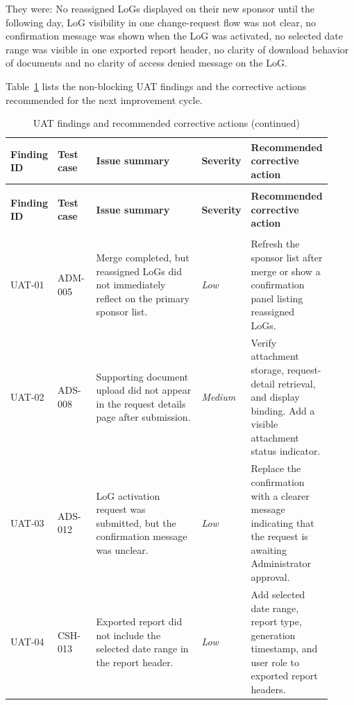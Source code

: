 They were: No reassigned LoGs displayed on their new sponsor until the following day, LoG visibility in one change-request flow was not clear, no confirmation message was shown when the LoG was activated, no selected date range was visible in one exported report header, no clarity of download behavior of documents and no clarity of access denied message on the LoG.

\setlength{\LTleft}{0pt}
\setlength{\LTright}{\fill}
Table~\ref{table:uat-findings} lists the non-blocking UAT findings and the corrective actions recommended for the next improvement cycle.

\begin{longtable}{>{\raggedright\arraybackslash}p{0.12\linewidth}
>{\raggedright\arraybackslash}p{0.12\linewidth}
>{\raggedright\arraybackslash}p{0.33\linewidth}
>{\raggedright\arraybackslash}p{0.10\linewidth}
>{\raggedright\arraybackslash}p{0.25\linewidth}}
\caption{UAT findings and recommended corrective actions}\label{table:uat-findings}\\
\toprule
\textbf{Finding ID} & \textbf{Test case} & \textbf{Issue summary} & \textbf{Severity} & \textbf{Recommended corrective action} \\
\midrule
\endfirsthead
\caption[]{UAT findings and recommended corrective actions (continued)}\\
\toprule
\textbf{Finding ID} & \textbf{Test case} & \textbf{Issue summary} & \textbf{Severity} & \textbf{Recommended corrective action} \\
\midrule
\endhead
\midrule
\multicolumn{5}{r}{\textit{Continued on next page}}\\
\endfoot
\bottomrule
\endlastfoot
UAT-01 & ADM-005 & Merge completed, but reassigned LoGs did not immediately reflect on the primary sponsor list. & \textit{Low} & Refresh the sponsor list after merge or show a confirmation panel listing reassigned LoGs. \\
UAT-02 & ADS-008 & Supporting document upload did not appear in the request details page after submission. & \textit{Medium} & Verify attachment storage, request-detail retrieval, and display binding. Add a visible attachment status indicator. \\
UAT-03 & ADS-012 & LoG activation request was submitted, but the confirmation message was unclear. & \textit{Low} & Replace the confirmation with a clearer message indicating that the request is awaiting Administrator approval. \\
UAT-04 & CSH-013 & Exported report did not include the selected date range in the report header. & \textit{Low} & Add selected date range, report type, generation timestamp, and user role to exported report headers. \\

\end{longtable}
